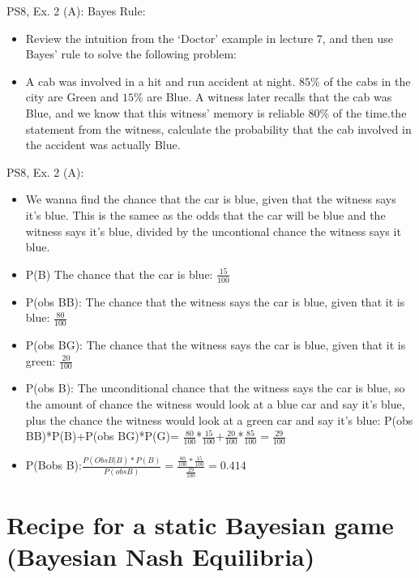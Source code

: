 \begin{frame}{PS8, Ex. 2 (A): Bayes Rule:}
    \vspace{-10pt}
    \begin{itemize}
        \item Review the intuition from the ‘Doctor’ example in lecture 7, and then use Bayes’ rule to solve the following problem:
        \item A cab was involved in a hit and run accident at night. $85\%$ of the cabs in the city are Green and $15\%$ are Blue. A witness later recalls that the cab was Blue, and we know that this witness’ memory is reliable $80\%$ of the time.\textbar the statement from the witness, calculate the probability that the cab involved in the accident was actually Blue.
    \end{itemize}
    \vfill\null
\end{frame}

\begin{frame}{PS8, Ex. 2 (A): }
    \begin{itemize}
    \item[] We wanna find the chance that the car is blue, given that the witness says it's blue. This is the samee as the odds that the car will be blue and the witness says it's blue, divided by the uncontional chance the witness says it blue.
        \item P(B) The chance that the car is blue: $\frac{15}{100}$
        \item P(obs B\textbar B): The chance that the witness says the car is blue, given that it is blue: $\frac{80}{100}$
        \item P(obs B\textbar G): The chance that the witness says the car is blue, given that it is green: $\frac{20}{100}$
        \item P(obs B): The unconditional chance that the witness says the car is blue, so the amount of chance the witness would look at a blue car and say it's blue, plus the chance the witness would look at a green car and say it's blue: P(obs B\textbar B)*P(B)+P(obs B\textbar G)*P(G)= $\frac{80}{100}$*$\frac{15}{100}$+$\frac{20}{100}$*$\frac{85}{100}=\frac{29}{100}$
        \item P(B\textbar obs B):$\frac{P(Obs B | B)*P(B)}{P(obs B)}=\frac{\frac{80}{100}*\frac{15}{100}}{\frac{29}{100}}=0.414$
    \end{itemize}
\end{frame}



\section{Recipe for a static Bayesian game (Bayesian Nash Equilibria)}

